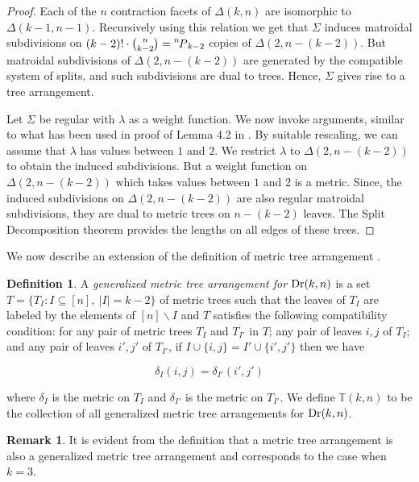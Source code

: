\documentclass[10pt,a4paper]{amsart}
\newcommand{\TT}{\mathbb{T}}
\DeclareMathOperator{\Dr}{\rm Dr}
\newcommand\Myperm[2][^n]{\prescript{#1\mkern-2.5mu}{}P_{#2}}
\theoremstyle{plain}
\theoremstyle{definition}
\newtheorem{definition}[theorem]{Definition}
\newtheorem{remark}[theorem]{Remark}
\numberwithin{subcase}{case}
\begin{document}
\begin{proof}
Each of the $n$ contraction facets of $\Delta(k,n)$ are  isomorphic to $\Delta(k-1,n-1)$. Recursively using this relation we get that $\Sigma$ induces matroidal subdivisions on $(k-2)! \cdot {\binom{n}{k-2}} = \Myperm[n]{k-2}$ copies of $\Delta(2,n-(k-2))$. But matroidal subdivisions of $\Delta(2,n-(k-2))$ are generated by the compatible system of splits, and such subdivisions are dual to trees. Hence, $\Sigma$ gives rise to a tree arrangement.

Let $\Sigma$ be regular with $\lambda$ as a weight function. We now invoke arguments, similar to what has been used in proof of Lemma 4.2 in \cite{herrmann2009draw}. By suitable rescaling, we can assume that $\lambda$ has values between $1$ and $2$. We restrict $\lambda$ to $\Delta(2,n-(k-2))$ to obtain the induced subdivisions. But a weight function on $\Delta(2,n-(k-2))$ which takes values between $1$ and $2$ is a metric. Since, the induced subdivisions on $\Delta(2,n-(k-2))$ are also regular matroidal subdivisions, they are dual to metric trees on $n-(k-2)$ leaves. The Split Decomposition theorem \cite[Theorem 2.11]{herrmann2008splitting} provides the lengths on all edges of these trees.
\end{proof}

\setcounter{theorem}{20}
We now describe an extension of the definition of metric tree arrangement \cite{herrmann2009draw}. 

\begin{definition}\label{def:gen_metric_tr_arr}
A \textit{generalized metric tree arrangement for $\Dr(k,n)$} is a set $T = \{T_I \colon I \subseteq [n], \ |I| = k-2 \}$ of metric trees such that the leaves of $T_I$ are labeled by the elements of $[n] \backslash I$ and $T$ satisfies the following compatibility condition: for any pair of metric trees $T_I$ and $T_{I'}$ in $T$; any pair of leaves $i, j$ of $T_I$; and any pair of leaves $i', j'$ of $T_{I'}$, if $I \cup \{i,j\} = I' \cup \{i', j'\}$ then we have

\begin{equation}\label{eq:comptability}
 \delta_I(i,j) = \delta_{I'}(i', j')
\end{equation}

where $\delta_I$ is the metric on $T_I$ and $\delta_{I'}$ is the metric on $T_{I'}$. We define $\TT(k,n)$ to be the collection of all generalized metric tree arrangements for $\Dr(k,n)$.
\end{definition}


\begin{remark}
It is evident from the definition that a metric tree arrangement is also a generalized metric tree arrangement and corresponds to the case when $k=3$.
\end{remark}
\end{document}
